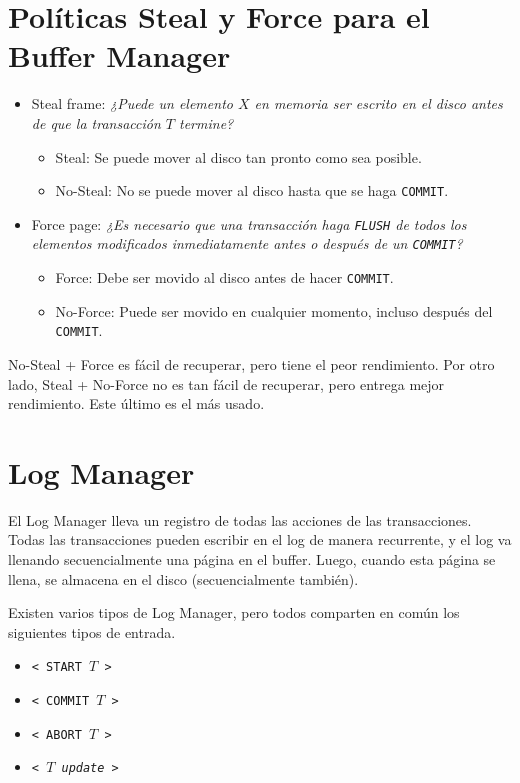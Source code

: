 \section{Pol\'iticas Steal y Force para el Buffer Manager}
\begin{itemize}
  \item Steal frame: \textit{¿Puede un elemento $X$ en memoria ser escrito en el disco antes de que la transacción $T$ termine?}
  \begin{itemize}
    \item Steal: Se puede mover al disco tan pronto como sea posible.
    \item No-Steal: No se puede mover al disco hasta que se haga \texttt{COMMIT}.
  \end{itemize}
  \item Force page: \textit{¿Es necesario que una transacción haga \texttt{FLUSH} de todos los elementos modificados inmediatamente antes o después de un \texttt{COMMIT}?}
  \begin{itemize}
    \item Force: Debe ser movido al disco antes de hacer \texttt{COMMIT}.
    \item No-Force: Puede ser movido en cualquier momento, incluso después del \texttt{COMMIT}.
  \end{itemize}
\end{itemize}

No-Steal + Force es f\'acil de recuperar, pero tiene el peor rendimiento. Por otro lado, Steal + No-Force no es tan fácil de recuperar, pero entrega mejor rendimiento. Este \'ultimo es el m\'as usado.

\section{Log Manager}
El Log Manager lleva un registro de todas las acciones de las transacciones. Todas las transacciones pueden escribir en el log de manera recurrente, y el log va llenando secuencialmente una p\'agina en el buffer. Luego, cuando esta p\'agina se llena, se almacena en el disco (secuencialmente también).

Existen varios tipos de Log Manager, pero todos comparten en com\'un los siguientes tipos de entrada.
\begin{itemize}
  \item \texttt{< START $T$ >}
  \item \texttt{< COMMIT $T$ >}
  \item \texttt{< ABORT $T$ >}
  \item \texttt{< $T$ \textit{update} >}
\end{itemize}
\pagebreak

